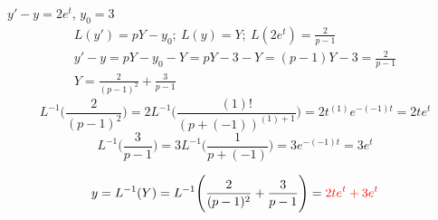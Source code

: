 \item [2.]$y'-y=2e^t$, $y_0=3$
\begin{gather*}
    L(y')=pY-y_0;\: L(y)=Y;\: L(2e^t)=\frac{2}{p-1}\\
    y'-y=pY-y_0-Y=pY-3-Y = (p-1)Y-3=\frac{2}{p-1}\\
    Y = \frac{2}{(p-1)^2}+\frac{3}{p-1}
\end{gather*}
\begin{equation*}
    L^{-1}\Bigg(\frac{2}{(p-1)^2}\Bigg) 
    = 2L^{-1}\Bigg(\frac{(1)!}{(p+(-1))^{(1)+1}}\Bigg)
    =2t^{(1)}e^{-(-1)t}=2te^t
    \tag{By \( L6 \)}
\end{equation*}
\begin{equation*}
    L^{-1}\Bigg(\frac{3}{p-1}\Bigg)
    = 3L^{-1}\Bigg(\frac{1}{p+(-1)}\Bigg)
    =3e^{-(-1)t}=3e^t 
    \tag{By \( L2 \)}
\end{equation*}

\begin{gather*}
    y=L^{-1}(Y)=L^{-1}
    \Bigg(
    \frac{2}{(p-1)^2}+\frac{3}{p-1}
    \Bigg)=\textcolor{red}{2te^t+3e^t}
\end{gather*}

